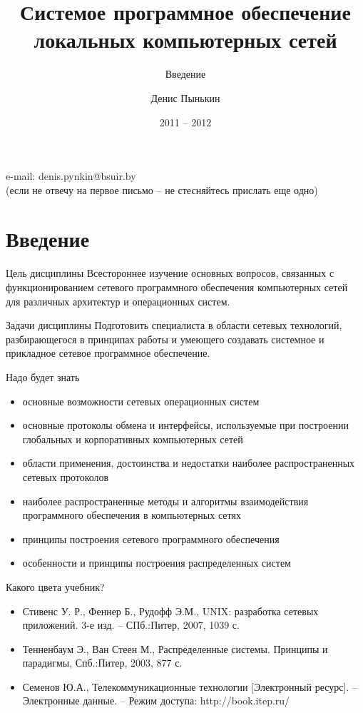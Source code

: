 \documentclass[ignorenonframetext, hyperref={pdftex, unicode}]{beamer}
\title[СПОЛКС]{Системое программное обеспечение локальных компьютерных сетей}
\subtitle{Введение}
\author{Денис Пынькин}
\date{2011 -- 2012}
\begin{document}
\begin{frame}
\titlepage
\begin{center}
e-mail: denis.pynkin@bsuir.by\\
{\tiny(если не отвечу на первое письмо -- не стесняйтесь прислать еще одно)}
\end{center}
\end{frame}

\section{Введение}

\begin{frame}{Цель дисциплины}
	Всестороннее изучение основных вопросов, связанных с функционированием сетевого программного обеспечения компьютерных сетей для различных архитектур и операционных систем.
\end{frame}

\begin{frame}{Задачи дисциплины}
	Подготовить специалиста в области сетевых технологий,  разбирающегося в принципах работы и умеющего создавать системное и прикладное сетевое программное обеспечение.
\end{frame}

\begin{frame}{Надо будет знать}
	\begin{itemize}
		\item основные возможности сетевых операционных систем
		\item основные протоколы обмена и интерфейсы, используемые при построении глобальных и корпоративных компьютерных сетей
		\item области применения,  достоинства и недостатки наиболее распространенных сетевых протоколов
		\item наиболее распространенные методы и алгоритмы взаимодействия программного обеспечения в компьютерных сетях
		\item принципы построения сетевого программного обеспечения
		\item особенности и принципы построения распределенных систем
	\end{itemize}
\end{frame}

\begin{frame}{Какого цвета учебник?}
	\begin{itemize}
		\item Стивенс У. Р.,  Феннер Б.,  Рудофф Э.М.,  UNIX: разработка сетевых приложений. 3-е изд. – СПб.:Питер,  2007,  1039 с.
		\item Тенненбаум Э.,  Ван Стеен М.,  Распределенные системы. Принципы и парадигмы,  Спб.:Питер,  2003,  877 с.
		\item Семенов Ю.А.,  Телекоммуникационные технологии [Электронный ресурс]. – Электронные данные. – Режим доступа: http://book.itep.ru/
	\end{itemize}
\end{frame}
\end{document}
